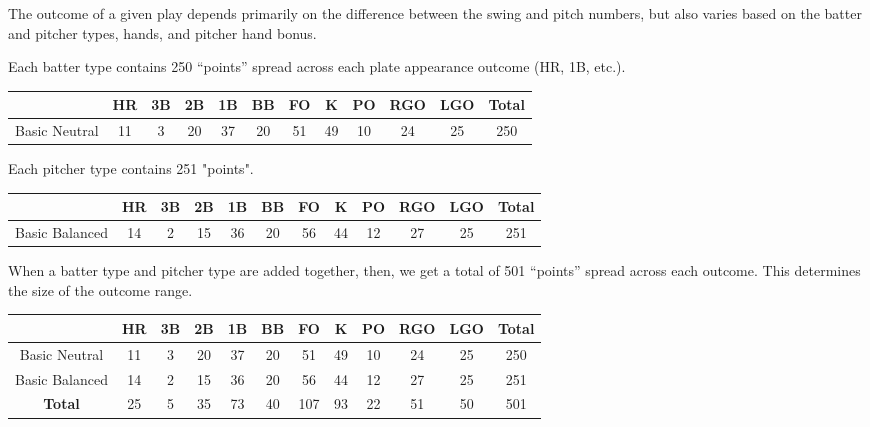 
The outcome of a given play depends primarily on the difference between the swing and pitch numbers, 
but also varies based on the batter and pitcher types, hands, and pitcher hand bonus.

Each batter type contains 250 “points” spread across each plate appearance outcome (HR, 1B, etc.).
\begin{center}
	\begin{tabular}{|c|c|c|c|c|c|c|c|c|c|c|c|}
		\hline 
		              & HR & 3B & 2B & 1B & BB & FO & K  & PO & RGO & LGO & Total \\
		\hline 
		Basic Neutral & 11 & 3  & 20 & 37 & 20 & 51 & 49 & 10 & 24  & 25  & 250   \\
		\hline
	\end{tabular}
\end{center}

Each pitcher type contains 251 "points".
\begin{center}
	\begin{tabular}{|c|c|c|c|c|c|c|c|c|c|c|c|}
		\hline 
		               & HR & 3B & 2B & 1B & BB & FO & K  & PO & RGO & LGO & Total \\
		\hline 
		Basic Balanced & 14 & 2  & 15 & 36 & 20 & 56 & 44 & 12 & 27  & 25  & 251   \\
		\hline
	\end{tabular}
\end{center}

When a batter type and pitcher type are added together, then, we get a total of 501 “points” spread across each outcome. 
This determines the size of the outcome range.

\begin{center}
	\begin{tabular}{|c|c|c|c|c|c|c|c|c|c|c|c|}
		\hline 
		               & HR & 3B & 2B & 1B & BB & FO  & K  & PO & RGO & LGO & Total \\
		\hline 
		Basic Neutral  & 11 & 3  & 20 & 37 & 20 & 51  & 49 & 10 & 24  & 25  & 250   \\
		\hline 
		Basic Balanced & 14 & 2  & 15 & 36 & 20 & 56  & 44 & 12 & 27  & 25  & 251   \\
		\hline
		\textbf{Total} & 25 & 5  & 35 & 73 & 40 & 107 & 93 & 22 & 51  & 50  & 501   \\
		\hline
	\end{tabular}
\end{center}

